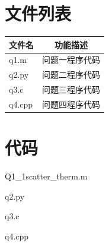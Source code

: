 \documentclass[withoutpreface,bwprint]{cumcmthesis}
\begin{document}
\begin{appendices}
\section{文件列表}
\begin{table}[H]
\centering
\begin{tabularx}{\textwidth}{LC}
\toprule
文件名   & 功能描述 \\
\midrule
q1.m & 问题一程序代码 \\
q2.py & 问题二程序代码 \\
q3.c & 问题三程序代码 \\
q4.cpp & 问题四程序代码 \\
\bottomrule
\end{tabularx}
\label{tab:文件列表}
\end{table}

\section{代码}
\noindent Q1\_1scatter\_therm.m

q2.py

q3.c

q4.cpp

\end{appendices}
\end{document}
